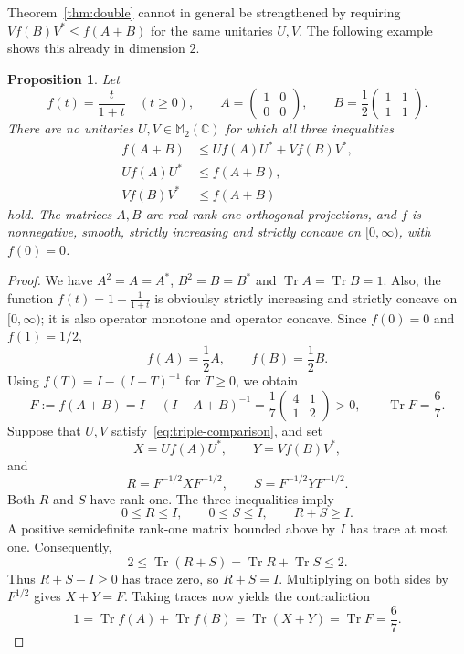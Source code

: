 \documentclass[11pt]{amsart}
\numberwithin{equation}{section}
\newtheorem{proposition}[theorem]{Proposition}
\newcommand{\Tr}{\operatorname{Tr}}
\begin{document}
Theorem~\ref{thm:double} cannot in general be strengthened by requiring
$Vf(B)V^*\leq f(A+B)$ for the same unitaries $U,V$.
The following example shows this already in dimension $2$.

\begin{proposition}\label{prop:triple-counterexample}
Let
\[
 f(t)=\frac{t}{1+t}\quad(t\geq0),
 \qquad
 A=\begin{pmatrix}1&0\\0&0\end{pmatrix},
 \qquad
 B=\frac12\begin{pmatrix}1&1\\1&1\end{pmatrix}.
\]
There are no unitaries $U,V\in\mathbb M_2(\mathbb C)$ for which all three
inequalities
\begin{equation}\label{eq:triple-comparison}
 \begin{split}
 f(A+B)&\leq Uf(A)U^*+Vf(B)V^*,\\
 Uf(A)U^*&\leq f(A+B),\\
 Vf(B)V^*&\leq f(A+B)
 \end{split}
\end{equation}
hold. The matrices $A,B$ are real rank-one orthogonal projections,
and $f$ is nonnegative, smooth, strictly increasing and strictly
concave on $[0,\infty)$, with $f(0)=0$.
\end{proposition}

\begin{proof}
We have $A^2=A=A^*$, $B^2=B=B^*$ and
$\Tr A=\Tr B=1$. Also, the function $f(t)=1-\frac{1}{1+t}$ is obvioulsy strictly increasing and
strictly concave on $[0,\infty)$; it is also operator monotone
and operator concave.
Since $f(0)=0$ and $f(1)=1/2$,
\[
 f(A)=\frac12A,
 \qquad
 f(B)=\frac12B.
\]
Using $f(T)=I-(I+T)^{-1}$ for $T\geq0$, we obtain
\[
 F:=f(A+B)
 =I-(I+A+B)^{-1}
 =\frac17\begin{pmatrix}4&1\\1&2\end{pmatrix}>0,
 \qquad \Tr F=\frac67.
\]
Suppose that $U,V$ satisfy~\eqref{eq:triple-comparison}, and set
\[
 X=Uf(A)U^*,\qquad Y=Vf(B)V^*,
\]
and
\[
 R=F^{-1/2}XF^{-1/2},\qquad S=F^{-1/2}YF^{-1/2}.
\]
Both $R$ and $S$ have rank one. The three inequalities imply
\[
 0\leq R\leq I,\qquad 0\leq S\leq I,\qquad R+S\geq I.
\]
A positive semidefinite rank-one matrix bounded above by $I$ has
trace at most one. Consequently,
\[
 2\leq\Tr(R+S)=\Tr R+\Tr S\leq2.
\]
Thus $R+S-I\geq0$ has trace zero, so $R+S=I$.
Multiplying on both sides by $F^{1/2}$ gives $X+Y=F$.
Taking traces now yields the contradiction
\[
 1=\Tr f(A)+\Tr f(B)=\Tr(X+Y)=\Tr F=\frac67.
\]
\end{proof}
\end{document}
